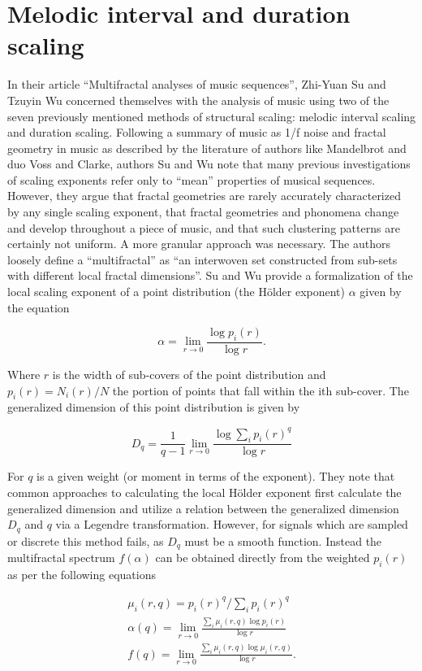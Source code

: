\documentclass{article}
\begin{document}
\section{Melodic interval and duration scaling}

In their article “Multifractal analyses of music sequences”\cite{12}, Zhi-Yuan Su and
Tzuyin Wu concerned themselves with the analysis of music using two of the seven
previously mentioned methods of structural scaling: melodic interval scaling and
duration scaling. Following a summary of music as 1/f noise and fractal geometry
in music as described by the literature of authors like Mandelbrot and duo Voss
and Clarke, authors Su and Wu note that many previous investigations of scaling
exponents refer only to “mean” properties of musical sequences. However, they
argue that fractal geometries are rarely accurately characterized by any single
scaling exponent, that fractal geometries and phonomena change and develop
throughout a piece of music, and that such clustering patterns are certainly not
uniform. A more granular approach was necessary. The authors loosely define a
“multifractal” as “an interwoven set constructed from sub-sets with different
local fractal dimensions”\cite{12}. Su and Wu provide a formalization of the local
scaling exponent of a point distribution (the Hölder exponent) $\alpha$ given by
the equation

\[
    \alpha = \lim_{r\to 0}\frac{\log p_i(r)}{\log r}.
\]

Where $r$ is the width of sub-covers of the point distribution and $p_i(r) =
N_i(r)/N$ the portion of points that fall within the ith sub-cover. The
generalized dimension of this point distribution is given by

\[
    D_q = \frac{1}{q-1}\lim_{r\to 0}\frac{\log\sum_i {p_i(r)}^q}{\log r}
\]

For $q$ is a given weight (or moment in terms of the exponent). They note that
common approaches to calculating the local Hölder exponent first calculate the
generalized dimension and utilize a relation between the generalized dimension
$D_q$ and $q$ via a Legendre transformation. However, for signals which are
sampled or discrete this method fails, as $D_q$ must be a smooth function.
Instead the multifractal spectrum $f(\alpha)$ can be obtained directly from the
weighted $p_i(r)$ as per the following equations

\begin{gather*}
    \mu_i(r,q) = {p_i(r)}^q / \sum_i {p_i(r)}^q \\
    \alpha(q) = \lim_{r\to 0}\frac{\sum_i \mu_i(r,q)\log p_i(r)}{\log r} \\
    f(q) = \lim_{r\to 0}\frac{\sum_i \mu_i(r, q)\log\mu_i(r,q)}{\log r}.
\end{gather*}
\end{document}
